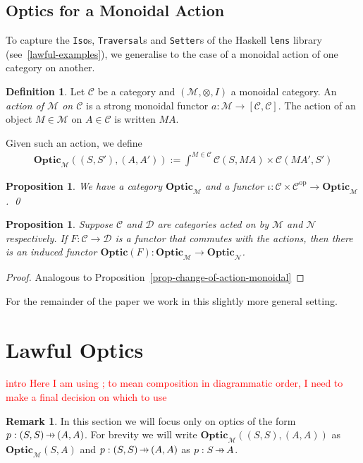 \documentclass[11pt,a4paper]{article}
\theoremstyle{plain}
\newtheorem{proposition}[theorem]{Proposition}
\theoremstyle{definition}
\newtheorem{definition}[theorem]{Definition}
\newtheorem{remark}[theorem]{Remark}
\newcommand{\C}{\mathscr{C}}
\newcommand{\D}{\mathscr{D}}
\newcommand{\M}{\mathscr{M}}
\newcommand{\N}{\mathscr{N}}
\newcommand{\Optic}{\mathbf{Optic}}
\newcommand{\op}{\mathrm{op}}
\newcommand{\hto}{\ensuremath{\,\mathaccent\shortmid\rightarrow\,}}
\newcommand{\todo}[1]{\textcolor{red}{\small #1}}
\begin{document}
\subsection{Optics for a Monoidal Action}

To capture the \texttt{Iso}s, \texttt{Traversal}s and \texttt{Setter}s of the Haskell \texttt{lens} library (see~\ref{lawful-examples}), we generalise to the case of a monoidal action of one category on another.

\begin{definition}
  Let $\C$ be a category and $(\M, \otimes, I)$ a monoidal category. An \emph{action of $\M$ on $\C$} is a strong monoidal functor $a : \M \to [\C, \C]$. The action of an object $M \in \M$ on $A \in \C$ is written $MA$.
\end{definition}

Given such an action, we define
\begin{align*}
  \Optic_\M((S, S'), (A, A')) := \int^{M \in \C} \C(S, MA) \times \C(MA', S')
\end{align*}

\begin{proposition}
  We have a category $\Optic_\M$ and a functor $\iota : \C \times \C^\op \to \Optic_\M$. \qed
\end{proposition}

\begin{proposition}\label{prop-change-of-action}
  Suppose $\C$ and $\D$ are categories acted on by $\M$ and $\mathcal{N}$ respectively. If $F : \C \to \D$ is a functor that commutes with the actions, then there is an induced functor $\Optic(F) : \Optic_\M \to \Optic_\N$.
\end{proposition}
\begin{proof}
  Analogous to Proposition~\ref{prop-change-of-action-monoidal}
\end{proof}

For the remainder of the paper we work in this slightly more general setting.

\section{Lawful Optics}
\todo{intro}
\todo{Here I am using ; to mean composition in diagrammatic order, I need to make a final decision on which to use}

\begin{remark}
  In this section we will focus only on optics of the form $p : (S,S) \hto (A, A)$. For brevity we will write $\Optic_\M((S, S), (A, A))$ as $\Optic_\M(S, A)$ and $p : (S, S) \hto (A, A)$ as $p : S \hto A$.
\end{remark}
\end{document}
